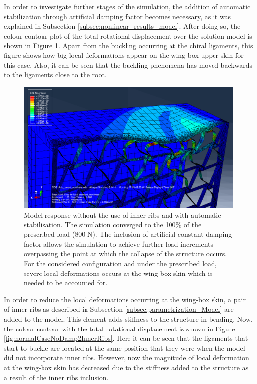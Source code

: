     In order to investigate further stages of the simulation, the addition of automatic stabilization through artificial damping factor becomes necessary, as it was explained in Subsection \ref{subsec:nonlinear_results_model}. After doing so, the colour contour plot of the total rotational displacement over the solution model is shown in Figure \ref{fig:normalCaseDampNoInnerRibs}. Apart from the buckling occurring at the chiral ligaments, this figure shows how big local deformations appear on the wing-box upper skin for this case. Also, it can be seen that the buckling phenomena has moved backwards to the ligaments close to the root.

    \begin{figure}[!htpb]
      \centering
      \includegraphics[width=0.8 \textwidth]{figures/result-model/normalCaseDampNoInnerRibs}
      \caption[Model response without the use of inner ribs and with automatic stabilization]{Model response without the use of inner ribs and with automatic stabilization. The simulation converged to the 100\% of the prescribed load (800 N). The inclusion of artificial constant damping factor allows the simulation to achieve further load increments, overpassing the point at which the collapse of the structure occurs. For the considered configuration and under the prescribed load, severe local deformations occurs at the wing-box skin which is needed to be accounted for.}\label{fig:normalCaseDampNoInnerRibs}
    \end{figure}

    In order to reduce the local deformations occurring at the wing-box skin, a pair of inner ribs as described in Subsection \ref{subsec:parametrization_Model} are added to the model. This element adds stiffness to the structure in bending. Now, the colour contour with the total rotational displacement is shown in Figure \ref{fig:normalCaseNoDamp2InnerRibs}. Here it can be seen that the ligaments that start to buckle are located at the same position that they were when the model did not incorporate inner ribs. However, now the magnitude of local deformation at the wing-box skin has decreased due to the stiffness added to the structure as a result of the inner ribs inclusion.

